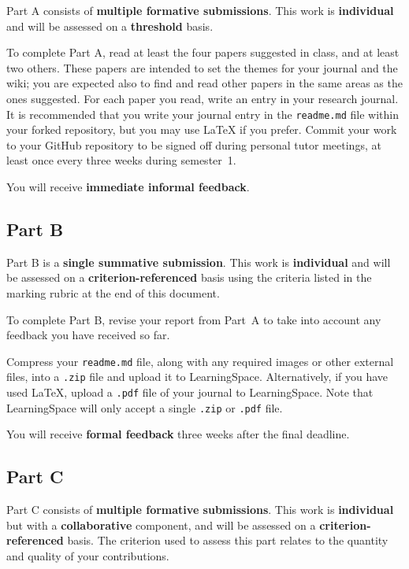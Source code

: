\documentclass{../../fal_assignment}
\begin{document}
Part A consists of \textbf{multiple formative submissions}. This work is \textbf{individual} and will be assessed on a \textbf{threshold} basis.

To complete Part A, read at least the four papers suggested in class, and at least two others.
These papers are intended to set the themes for your journal and the wiki;
you are expected also to find and read other papers in the same areas as the ones suggested.
For each paper you read, write an entry in your research journal.
It is recommended that you write your journal entry in the \texttt{readme.md} file within your forked repository,
but you may use LaTeX if you prefer.
Commit your work to your GitHub repository to be signed off during personal tutor meetings,
at least once every three weeks during semester~1.

You will receive \textbf{immediate informal feedback}.

\subsection*{Part B}

Part B is a \textbf{single summative submission}. This work is \textbf{individual} and will be assessed on a \textbf{criterion-referenced} basis
using the criteria listed in the marking rubric at the end of this document.

To complete Part B, revise your report from Part~A to take into account any feedback you have received so far.

Compress your \texttt{readme.md} file, along with any required images or other external files,
into a \texttt{.zip} file and upload it to LearningSpace.
Alternatively, if you have used LaTeX, upload a \texttt{.pdf} file of your journal to LearningSpace.
Note that LearningSpace will only accept a single \texttt{.zip} or \texttt{.pdf} file.

You will receive \textbf{formal feedback} three weeks after the final deadline.

\subsection*{Part C}

Part C consists of \textbf{multiple formative submissions}. This work is \textbf{individual} but with a \textbf{collaborative} component, and will be assessed on a \textbf{criterion-referenced} basis.
The criterion used to assess this part relates to the quantity and quality of your contributions.
\end{document}
